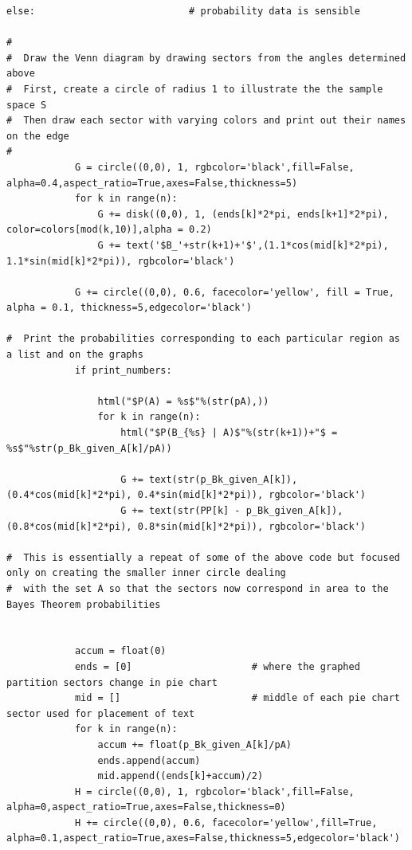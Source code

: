 \documentclass[10pt,]{book}
\theoremstyle{plain}
\theoremstyle{definition}
\theoremstyle{definition}
\theoremstyle{definition}
\numberwithin{equation}{section}
\begin{document}
\begin{lstlisting}[style=sageinput]
        else:                           # probability data is sensible
 
#        
#  Draw the Venn diagram by drawing sectors from the angles determined above
#  First, create a circle of radius 1 to illustrate the the sample space S
#  Then draw each sector with varying colors and print out their names on the edge
#
            G = circle((0,0), 1, rgbcolor='black',fill=False, alpha=0.4,aspect_ratio=True,axes=False,thickness=5)
            for k in range(n):
                G += disk((0,0), 1, (ends[k]*2*pi, ends[k+1]*2*pi), color=colors[mod(k,10)],alpha = 0.2)
                G += text('$B_'+str(k+1)+'$',(1.1*cos(mid[k]*2*pi), 1.1*sin(mid[k]*2*pi)), rgbcolor='black')
                
            G += circle((0,0), 0.6, facecolor='yellow', fill = True, alpha = 0.1, thickness=5,edgecolor='black') 
    
#  Print the probabilities corresponding to each particular region as a list and on the graphs
            if print_numbers:               

                html("$P(A) = %s$"%(str(pA),))
                for k in range(n):
                    html("$P(B_{%s} | A)$"%(str(k+1))+"$ = %s$"%str(p_Bk_given_A[k]/pA))
                                        
                    G += text(str(p_Bk_given_A[k]),(0.4*cos(mid[k]*2*pi), 0.4*sin(mid[k]*2*pi)), rgbcolor='black')
                    G += text(str(PP[k] - p_Bk_given_A[k]),(0.8*cos(mid[k]*2*pi), 0.8*sin(mid[k]*2*pi)), rgbcolor='black')
        
#  This is essentially a repeat of some of the above code but focused only on creating the smaller inner circle dealing
#  with the set A so that the sectors now correspond in area to the Bayes Theorem probabilities


            accum = float(0)                        
            ends = [0]                     # where the graphed partition sectors change in pie chart 
            mid = []                       # middle of each pie chart sector used for placement of text
            for k in range(n): 
                accum += float(p_Bk_given_A[k]/pA) 
                ends.append(accum)
                mid.append((ends[k]+accum)/2)
            H = circle((0,0), 1, rgbcolor='black',fill=False, alpha=0,aspect_ratio=True,axes=False,thickness=0)
            H += circle((0,0), 0.6, facecolor='yellow',fill=True, alpha=0.1,aspect_ratio=True,axes=False,thickness=5,edgecolor='black')
            

\end{lstlisting}
\end{document}
